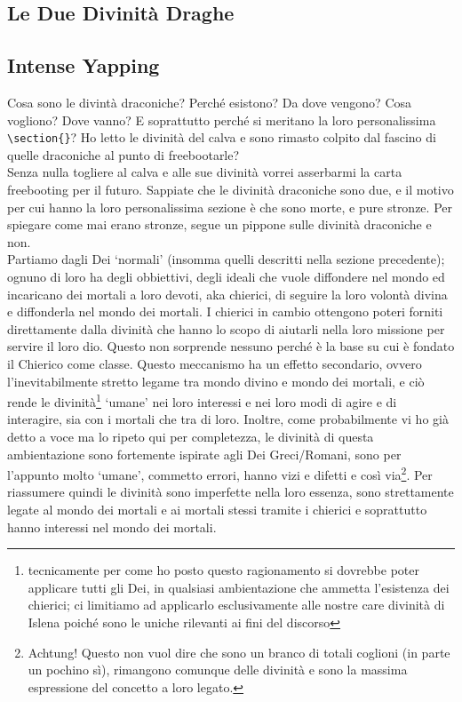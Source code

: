 \documentclass[a4paper]{report}
\begin{document}
\begin{multicols}{2}
\section{Le Due Divinità Draghe}
\subsection*{Intense Yapping}
Cosa sono le divintà draconiche? Perché esistono? Da dove vengono? Cosa vogliono? Dove vanno? E soprattutto perché si meritano la loro personalissima \verb|\section{}|?
Ho letto le divinità del calva e sono rimasto colpito dal fascino di quelle draconiche al punto di freebootarle? \\
Senza nulla togliere al calva e alle sue divinità vorrei asserbarmi la carta freebooting per il futuro. Sappiate che le divinità draconiche sono due, e il motivo per cui hanno la loro personalissima sezione è che sono morte, e pure stronze. Per spiegare come mai erano stronze, segue un pippone sulle divinità draconiche e non.\\
Partiamo dagli Dei \enquote*{normali} (insomma quelli descritti nella sezione precedente); ognuno di loro ha degli obbiettivi, degli ideali che vuole diffondere nel mondo ed incaricano dei mortali a loro devoti, aka chierici, di seguire la loro volontà divina e diffonderla nel mondo dei mortali. I chierici in cambio ottengono poteri forniti direttamente dalla divinità che hanno lo scopo di aiutarli nella loro missione per servire il loro dio. Questo non sorprende nessuno perché è la base su cui è fondato il Chierico come classe. Questo meccanismo ha un effetto secondario, ovvero l'inevitabilmente stretto legame tra mondo divino e mondo dei mortali, e ciò rende le divinità\footnote{tecnicamente per come ho posto questo ragionamento si dovrebbe poter applicare tutti gli Dei, in qualsiasi ambientazione che ammetta l'esistenza dei chierici; ci limitiamo ad applicarlo esclusivamente alle nostre care divinità di Islena poiché sono le uniche rilevanti ai fini del discorso} \enquote*{umane} nei loro interessi e nei loro modi di agire e di interagire, sia con i mortali che tra di loro. Inoltre, come probabilmente vi ho già detto a voce ma lo ripeto qui per completezza, le divinità di questa ambientazione sono fortemente ispirate agli Dei Greci/Romani, sono per l'appunto molto \enquote*{umane}, commetto errori, hanno vizi e difetti e così via\footnote{Achtung! Questo non vuol dire che sono un branco di totali coglioni (in parte un pochino sì), rimangono comunque delle divinità e sono la massima espressione del concetto a loro legato.}. Per riassumere quindi le divinità sono imperfette nella loro essenza, sono strettamente legate al mondo dei mortali e ai mortali stessi tramite i chierici e soprattutto hanno interessi nel mondo dei mortali. \\

\end{multicols}
\end{document}
